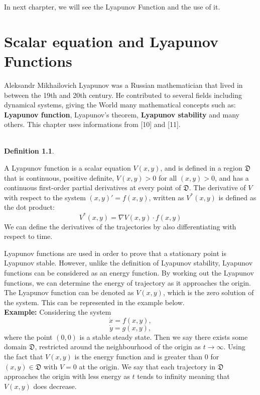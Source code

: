 \documentclass[a4paper]{report}
\theoremstyle{definition}
\newtheorem{defn}[thm]{Definition}
\begin{document}
In next charpter, we will see the Lyapunov Function and the use of it.

\chapter{Scalar equation and Lyapunov Functions}
Aleksandr Mikhailovich Lyapunov was a Russian mathematician that lived in between the 19th and 20th century. He contributed to several fields including dynamical systems, giving the World many mathematical concepts such as: \textbf{Lyapunov function}, Lyapunov's theorem, \textbf{Lyapunov stability}
and many others. This chapter uses informations from [10] and [11]. 
\\
\\
\begin{mdframed}[backgroundcolor=airforceblue!25] 
\begin{defn}
\label{lgdef3}

A Lyapunov function is a scalar equation $V(x,y)$, and is defined in a region $\mathfrak{D}$ that is continuous, positive definite, $V(x,y)>0$ for all $(x,y)>0$, and has a continuous first-order partial derivatives at every point of $\mathfrak{D}$. The derivative of $V$ with respect to the system $(x,y)'=f(x,y)$, written as $V^*(x,y)$ is defined as the dot product:
\begin{equation}
V^*(x,y)=\nabla V(x,y)\cdot f(x,y)
\end{equation}
We can define the derivatives of the trajectories by also differentiating with respect to time.
\end{defn}
\end{mdframed}
Lyapunov functions are used in order to prove that a stationary point is Lyapunov stable. However, unlike the definition of Lyapunov stability, Lyapunov functions can be considered as an energy function. By working out the Lyapunov functions, we can determine the energy of trajectory as it approaches the origin. The Lyapunov function can be denoted as $V(x,y)$, which is the zero solution of the system. This can be represented in the example below.
\newline
\\
\textbf{Example:} Considering the system 
\begin{equation}\label{eq:5}
\dot{x}=f(x,y),
\end{equation}
\begin{equation}\label{eq:6}
\dot{y}=g(x,y),
\end{equation}
where the point $(0,0)$ is a stable steady state. Then we say there exists some domain $\mathfrak{D}$, restricted around the neighbourhood of the origin as $t\rightarrow\infty$. Using the fact that $V(x,y)$ is the energy function and is greater than 0 for $(x,y)\in \mathfrak{D}$ with $V =0$ at the origin. We say that each trajectory in $\mathfrak{D}$ approaches the origin with less energy as $t$ tends to infinity meaning that $V(x,y)$ does decrease.
\end{document}

